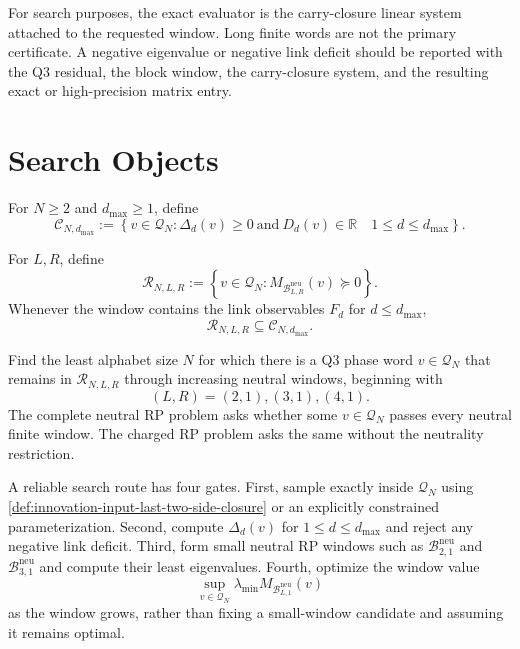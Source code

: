 \begin{principle}
\label{prin:innovation-input-exact-evaluator-contract}
For search purposes, the exact evaluator is the carry-closure linear
system attached to the requested window. Long finite words are not the
primary certificate. A negative eigenvalue or negative link deficit should
be reported with the Q3 residual, the block window, the carry-closure
system, and the resulting exact or high-precision matrix entry.
\end{principle}

\section{Search Objects}
\label{sec:innovation-input-rp-search-objects}

\begin{definition}
\label{def:innovation-input-link-screen-feasible-set}
For $N\ge2$ and $d_{\max}\ge1$, define
$$
\mathcal C_{N,d_{\max}}
:=
\left\{
v\in\mathcal Q_N:
\Delta_d(v)\ge0
\ \text{and}\
D_d(v)\in\mathbb R
\quad
1\le d\le d_{\max}
\right\}.
$$
\end{definition}

\begin{definition}
\label{def:innovation-input-window-rp-feasible-set}
For $L,R$, define
$$
\mathcal R_{N,L,R}
:=
\left\{
v\in\mathcal Q_N:
M_{\mathcal B_{L,R}^{\mathrm{neu}}}(v)\succeq0
\right\}.
$$
Whenever the window contains the link observables $F_d$ for
$d\le d_{\max}$,
$$
\mathcal R_{N,L,R}\subseteq\mathcal C_{N,d_{\max}}.
$$
\end{definition}

\begin{principle}
\label{prob:innovation-input-minimal-rp-candidate}
Find the least alphabet size $N$ for which there is a Q3 phase word
$v\in\mathcal Q_N$ that remains in $\mathcal R_{N,L,R}$ through increasing
neutral windows, beginning with
$$
(L,R)=(2,1),(3,1),(4,1).
$$
The complete neutral RP problem asks whether some $v\in\mathcal Q_N$
passes every neutral finite window. The charged RP problem asks the same
without the neutrality restriction.
\end{principle}

\begin{principle}
\label{prin:innovation-input-rp-search-route}
A reliable search route has four gates. First, sample exactly inside
$\mathcal Q_N$ using
\autoref{def:innovation-input-last-two-side-closure} or an explicitly
constrained parameterization. Second, compute $\Delta_d(v)$ for
$1\le d\le d_{\max}$ and reject any negative link deficit. Third, form
small neutral RP windows such as $\mathcal B_{2,1}^{\mathrm{neu}}$ and
$\mathcal B_{3,1}^{\mathrm{neu}}$ and compute their least eigenvalues.
Fourth, optimize the window value
$$
\sup_{v\in\mathcal Q_N}
\lambda_{\min}M_{\mathcal B_{L,1}^{\mathrm{neu}}}(v)
$$
as the window grows, rather than fixing a small-window candidate and
assuming it remains optimal.
\end{principle}

